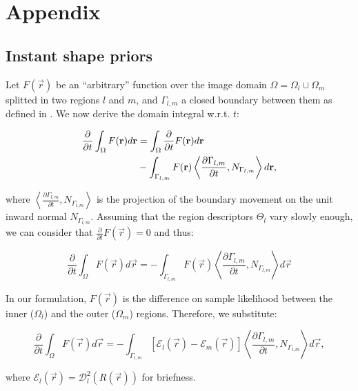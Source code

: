 \renewcommand{\theequation}{A.\arabic{equation}}

\section*{Appendix}

\subsection*{Instant shape priors}
\label{app:shape_priors}
Let $F(\vec{r})$ be an ``arbitrary'' function over the image domain
  $\Omega = \Omega_l \cup \Omega_m$ splitted in two regions $l$ and
  $m$, and $\Gamma_{l,m}$ a closed boundary between them
  as defined in .
We now derive the domain integral w.r.t. $t$:

  \begin{align*}
  \frac{\partial}{\partial t} \int_\Omega F(\vec{r}) d\vec{r} &=
  \int_\Omega \frac{\partial}{\partial t}F(\vec{r}) d\vec{r} \notag\\
  &- \int_{\Gamma_{l,m}} F(\vec{r}) \left\langle \frac{\partial \Gamma_{l,m} }{\partial t},
  N_{\Gamma_{l,m}}\right\rangle d\vec{r},
  \end{align*}

  where $\left\langle\frac{\partial\Gamma_{l,m}}{\partial t}, N_{\Gamma_{l,m}}\right\rangle$ is
  the projection of the boundary movement on the unit inward normal $N_{\Gamma_{l,m}}$.
Assuming that the region descriptors $\Theta_l$ vary slowly enough, we can consider
  that $\frac{\partial}{\partial t} F(\vec{r}) = 0$ and thus:

  \begin{equation*}
  \frac{\partial}{\partial t} \int_\Omega F(\vec{r}) d\vec{r} =
  - \int_{\Gamma_{l,m}} F(\vec{r}) \left\langle \frac{\partial \Gamma_{l,m} }{\partial t},
  N_{\Gamma_{l,m}}\right\rangle d\vec{r}
  \end{equation*}

  In our formulation, $F(\vec{r})$ is the difference on
    sample likelihood between the inner ($\Omega_l$) and the outer ($\Omega_m$) regions.
  Therefore, we substitute:

    \begin{equation}
    \frac{\partial}{\partial t} \int_\Omega F(\vec{r}) d\vec{r} =
    - \int_{\Gamma_{l,m}} \left[ \mathcal{E}_{l}(\vec{r}) - \mathcal{E}_{m}(\vec{r}) \right]
    \left\langle \frac{\partial \Gamma_{l,m} }{\partial t},
  N_{\Gamma_{l,m}}\right\rangle d\vec{r},
  	\label{eq:shape_gradients}
    \end{equation}

    where $\mathcal{E}_l(\vec{r}) = \mathcal{D}^2_{l}(R(\vec{r}))$ for briefness.